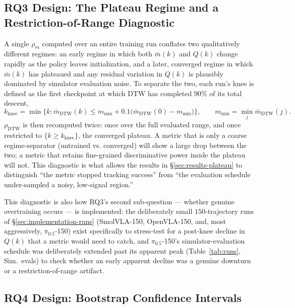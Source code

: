 \documentclass[english,12pt,a4paper,pdftex,elec,utf8]{aaltothesis}
\begin{document}
\subsection{RQ3 Design: The Plateau Regime and a Restriction-of-Range Diagnostic}
\label{sec:method-plateau}

A single $\rho_m$ computed over an entire training run conflates two qualitatively different regimes: an early regime in which both $\bar m(k)$ and $Q(k)$ change rapidly as the policy leaves initialization, and a later, converged regime in which $\bar m(k)$ has plateaued and any residual variation in $Q(k)$ is plausibly dominated by simulator evaluation noise. To separate the two, each run's knee is defined as the first checkpoint at which DTW has completed $90\%$ of its total descent,
\begin{equation}
  k_{\mathrm{knee}} = \min\Big\{k : \bar m_{\mathrm{DTW}}(k) \le m_{\min} + 0.1\big(\bar
  m_{\mathrm{DTW}}(0)-m_{\min}\big)\Big\}, \qquad m_{\min}=\min_j \bar m_{\mathrm{DTW}}(j).
  \label{eq:knee}
\end{equation}
$\rho_{\mathrm{DTW}}$ is then recomputed twice: once over the full evaluated range, and once restricted to $\{k\ge k_{\mathrm{knee}}\}$, the converged plateau. A metric that is only a coarse regime-separator (untrained vs. converged) will show a large drop between the two; a metric that retains fine-grained discriminative power inside the plateau will not. This diagnostic is what allows the results in \S\ref{sec:results-plateau} to distinguish ``the metric stopped tracking success'' from ``the evaluation schedule under-sampled a noisy, low-signal region.''

This diagnostic is also how RQ3's second sub-question --- whether genuine overtraining occurs --- is implemented: the deliberately small $150$-trajectory runs of \S\ref{sec:implementation-runs} (SmolVLA-150, OpenVLA-150, and, most aggressively, $\pi_{0.5}$-150) exist specifically to stress-test for a post-knee decline in $Q(k)$ that a metric would need to catch, and $\pi_{0.5}$-150's simulator-evaluation schedule was deliberately extended past its apparent peak (Table~\ref{tab:runs}, Sim.\ evals) to check whether an early apparent decline was a genuine downturn or a restriction-of-range artifact.

\subsection{RQ4 Design: Bootstrap Confidence Intervals}
\label{sec:method-bootstrap}
\end{document}
